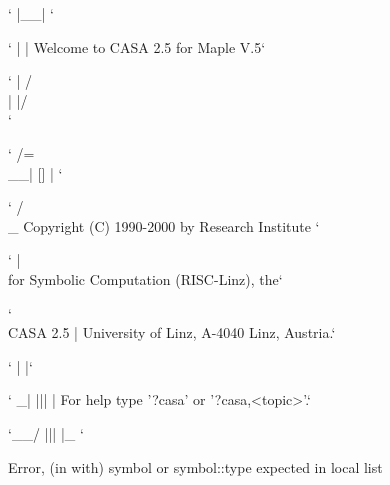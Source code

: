 \documentclass[a4paper,14pt,oneside]{extarticle}
\begin{document}
\begin{maplegroup}
\begin{mapleinput}
\end{mapleinput}

\mapleresult
\begin{maplettyout}
`           |__| `
\end{maplettyout}

\begin{maplettyout}
`           |  |          Welcome to CASA 2.5 for Maple V.5`
\end{maplettyout}

\begin{maplettyout}
`     |   /\\|  |/\\ `
\end{maplettyout}

\begin{maplettyout}
`    /=\\__|  []  | `
\end{maplettyout}

\begin{maplettyout}
`   /            \\_       Copyright (C) 1990-2000 by Research
Institute `
\end{maplettyout}

\begin{maplettyout}
`   |              \\      for Symbolic Computation (RISC-Linz), the`
\end{maplettyout}

\begin{maplettyout}
`   \\   CASA 2.5   |      University of Linz, A-4040 Linz, Austria.`
\end{maplettyout}

\begin{maplettyout}
`    |             |`
\end{maplettyout}

\begin{maplettyout}
`   _|     |||     |      For help type '?casa' or '?casa,<topic>'.`
\end{maplettyout}

\begin{maplettyout}
`__/       |||     |_ `
\end{maplettyout}

\begin{maplettyout}
Error, (in with) symbol or symbol::type expected in local list
\end{maplettyout}

\end{maplegroup}
\end{document}
